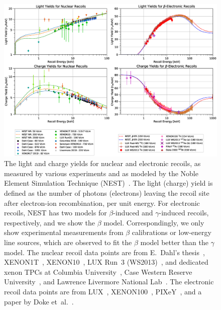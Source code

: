 \begin{figure}[!htbp]
\includegraphics[width=2.05\columnwidth]{fig_nest_light_and_charge_yields.eps}
\caption{The light and charge yields for nuclear and electronic recoils, as measured by various experiments and as modeled by the Noble Element Simulation Technique (NEST)~\cite{szydagis_m_2020_3905382}. The light (charge) yield is defined as the number of photons (electrons) leaving the recoil site after electron-ion recombination, per unit energy. For electronic recoils, NEST has two models for $\beta$-induced and $\gamma$-induced recoils, respectively, and we show the $\beta$ model. Correspondingly, we only show experimental measurements from $\beta$ calibrations or low-energy line sources, which are observed to fit the $\beta$ model better than the $\gamma$ model.
The nuclear recoil data points are from E.~Dahl's thesis~\cite{Dahl:2009nta}, XENON1T~\cite{Aprile:2019dme, Lin:2018xenon1t}, XENON10~\cite{Sorensen:2008ec, Sorensen:2010hq, Angle:2011th, Sorensen:2010hv}, LUX Run~3 (WS2013)~\cite{Akerib:2016mzi}, and dedicated xenon TPCs at Columbia University~\cite{Aprile:2018jvg}, Case Western Reserve University~\cite{Aprile:2006kx}, and Lawrence Livermore National Lab~\cite{Lenardo:2019fcn}. The electronic recoil data points are from LUX~\cite{Akerib:2019jtm, Akerib:2015wdi, Akerib:2017hph, Akerib:2016qlr}, XENON100~\cite{Aprile:2017xxh}, PIXeY~\cite{Boulton:2017hub}, and a paper by Doke et~al.~\cite{Doke:2002oab}.
}
\label{fig:NEST_Light_and_Charge_Yields}
\end{figure}

